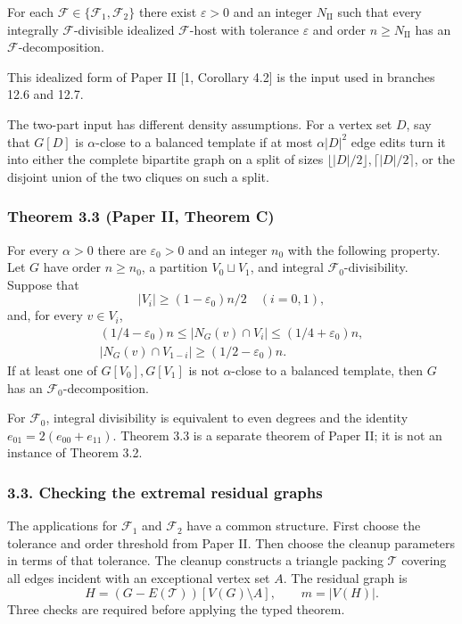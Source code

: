 \documentclass[english,11pt,a4paper]{article}
\begin{document}
For each \(\mathcal F\in\{\mathcal F_1,\mathcal F_2\}\) there exist \(\varepsilon>0\) and an integer \(N_{\mathrm{II}}\) such that every integrally \(\mathcal F\)-divisible idealized \(\mathcal F\)-host with tolerance \(\varepsilon\) and order \(n\ge N_{\mathrm{II}}\) has an \(\mathcal F\)-decomposition.

This idealized form of Paper II {[}1, Corollary 4.2{]} is the input used in branches 12.6 and 12.7.

The two-part input has different density assumptions. For a vertex set \(D\), say that \(G[D]\) is \(\alpha\)-close to a balanced template if at most \(\alpha|D|^2\) edge edits turn it into either the complete bipartite graph on a split of sizes \(\lfloor|D|/2\rfloor,\lceil|D|/2\rceil\), or the disjoint union of the two cliques on such a split.

\subsubsection{Theorem 3.3 (Paper II, Theorem C)}\label{theorem-3.3-paper-ii-theorem-c}

For every \(\alpha>0\) there are \(\varepsilon_0>0\) and an integer \(n_0\) with the following property. Let \(G\) have order \(n\ge n_0\), a partition \(V_0\sqcup V_1\), and integral \(\mathcal F_0\)-divisibility. Suppose that \[|V_i|\ge(1-\varepsilon_0)n/2\quad(i=0,1),
\tag{3.4}\] and, for every \(v\in V_i\), \[\begin{gathered}
(1/4-\varepsilon_0)n\le|N_G(v)\cap V_i|\le(1/4+\varepsilon_0)n,\\
|N_G(v)\cap V_{1-i}|\ge(1/2-\varepsilon_0)n.
\end{gathered}
\tag{3.5}\] If at least one of \(G[V_0],G[V_1]\) is not \(\alpha\)-close to a balanced template, then \(G\) has an \(\mathcal F_0\)-decomposition.

For \(\mathcal F_0\), integral divisibility is equivalent to even degrees and the identity \(e_{01}=2(e_{00}+e_{11})\). Theorem 3.3 is a separate theorem of Paper II; it is not an instance of Theorem 3.2.

\subsubsection{3.3. Checking the extremal residual graphs}\label{checking-the-extremal-residual-graphs}

The applications for \(\mathcal F_1\) and \(\mathcal F_2\) have a common structure. First choose the tolerance and order threshold from Paper II. Then choose the cleanup parameters in terms of that tolerance. The cleanup constructs a triangle packing \(\mathcal T\) covering all edges incident with an exceptional vertex set \(A\). The residual graph is \[H=(G-E(\mathcal T))[V(G)\setminus A],\qquad m=|V(H)|.
\tag{3.6}\] Three checks are required before applying the typed theorem.
\end{document}
